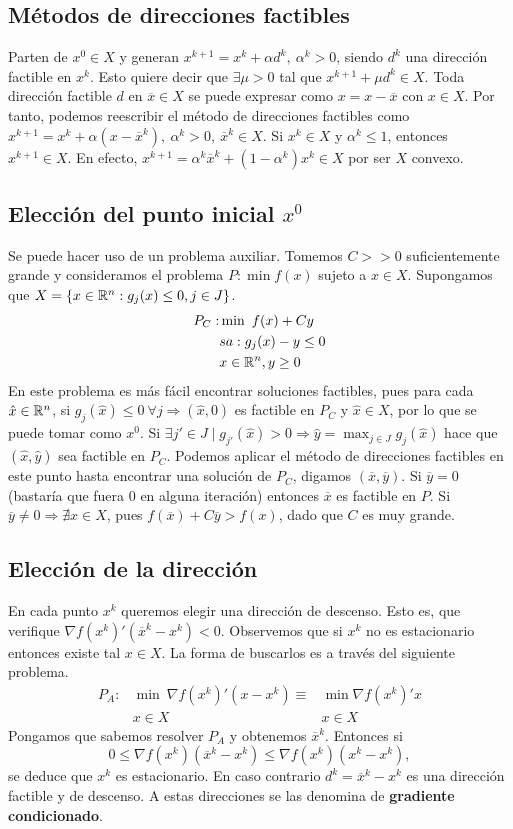 \documentclass[MIOP.tex]{subfiles}
\begin{document}
\subsection{Métodos de direcciones factibles}
Parten de $x^0\in X$ y generan $x^{k+1}=x^k+\alpha d^k,\ \alpha^k>0$, siendo $d^k$ una dirección factible en $x^k$. Esto quiere decir que $\exists\mu >0$ tal que $x^{k+1}+\mu d^k\in X$. Toda dirección factible $d$ en $\overline{x}\in X$ se puede expresar como $x=x-\overline{x}$ con $x\in X$. Por tanto, podemos reescribir el método de direcciones factibles como $x^{k+1}=x^k+\alpha (x-\overline{x}^k),\ \alpha^k>0,\ \overline{x}^k\in X$. Si $x^k\in X$ y $\alpha^k\leq 1$, entonces $x^{k+1}\in X$. En efecto, $x^{k+1}=\alpha^k\overline{x}^k+(1-\alpha^k)x^k\in X$ por ser $X$ convexo. 

\subsection{Elección del punto inicial $x^0$}
Se puede hacer uso de un problema auxiliar. Tomemos $C>>0$ suficientemente grande y consideramos el problema $P:\min f(x)$ sujeto a $x\in X$. Supongamos que $X=\{x\in\mathbb{R}^n: g_j(x)\leq 0, j\in J\}$. 
\begin{align*}
P_C:&\min\ f(x)+Cy\\
 & sa:g_j(x)-y\leq 0\\
 & x\in\mathbb{R}^n, y\geq 0
\end{align*}
En este problema es más fácil encontrar soluciones factibles, pues para cada $\hat{x}\in\mathbb{R}^n$, si $g_j(\hat{x})\leq 0\ \forall j\Rightarrow (\hat{x},0)$ es factible en $P_C$ y $\hat{x}\in X$, por lo que se puede tomar como $x^0$. Si $\exists j'\in J \mid g_{j'}(\hat{x})>0\Rightarrow \hat{y}=\max_{j\in J} g_j(\hat{x})$ hace que $(\hat{x},\hat{y})$ sea factible en $P_C$. Podemos aplicar el método de direcciones factibles en este punto hasta encontrar una solución de $P_C$, digamos $(\overline{x},\overline{y})$. Si $\overline{y}=0$ (bastaría que fuera 0 en alguna iteración) entonces $\overline{x}$ es factible en $P$. Si $\overline{y}\neq 0\Rightarrow\nexists x\in X$, pues $f(\overline{x})+C\overline{y}>f(x)$, dado que $C$ es muy grande.

\subsection{Elección de la dirección}
En cada punto $x^k$ queremos elegir una dirección de descenso. Esto es, que verifique $\nabla f(x^k)'(\overline{x}^k-x^k)<0$. Observemos que si $x^k$ no es estacionario entonces existe tal $x\in X$. La forma de buscarlos es a través del siguiente problema. 
\begin{align*}
P_A: &\min\ \nabla f(x^k)'(x-x^k) \equiv & \min \nabla f(x^k)'x\\
 & x\in X								& x\in X
\end{align*}
Pongamos que sabemos resolver $P_A$ y obtenemos $\overline{x}^k$. Entonces si $$0\leq\nabla f(x^k)(\overline{x}^k-x^k)\leq \nabla  f(x^k)(x^k-x^k),$$ se deduce que $x^k$ es estacionario. En caso contrario $d^k=\overline{x}^k-x^k$ es una dirección factible y de descenso. A estas direcciones se las denomina de \textbf{gradiente condicionado}.
\end{document}
